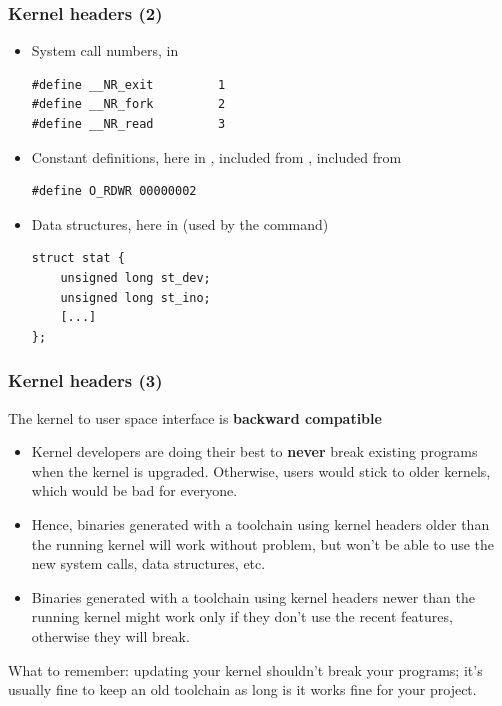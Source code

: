 \begin{frame}[fragile]
  \frametitle{Kernel headers (2)}
  \begin{itemize}
  \item System call numbers, in 
\begin{verbatim}
#define __NR_exit         1
#define __NR_fork         2
#define __NR_read         3
\end{verbatim}
  \item Constant definitions, here in ,
    included from , included from
\begin{verbatim}
#define O_RDWR 00000002
\end{verbatim}
\item Data structures, here in  (used by the
 command)
\begin{verbatim}
struct stat {
    unsigned long st_dev;
    unsigned long st_ino;
    [...]
};
\end{verbatim}
\end{itemize}
\end{frame}

\begin{frame}[fragile]
  \frametitle{Kernel headers (3)}
  The kernel to user space interface is {\bf backward compatible}
  \begin{itemize}
  \item Kernel developers are doing their best to {\bf never}
        break existing programs when the kernel is upgraded.
        Otherwise, users would stick to older kernels, which
        would be bad for everyone.
  \item Hence, binaries generated with a toolchain using kernel headers
        older than the running kernel will work without problem, but
        won't be able to use the new system calls, data structures, etc.
  \item Binaries generated with a toolchain using kernel headers
        newer than the running kernel might work only if they don't use
        the recent features, otherwise they will break.
  \end{itemize}
  What to remember: updating your kernel shouldn't break your programs;
  it's usually fine to keep an old toolchain as long is it works fine
  for your project.
\end{frame}

